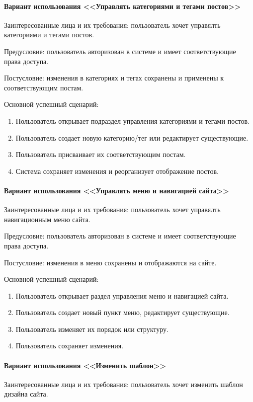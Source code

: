 \paragraph{Вариант использования <<Управлять категориями и тегами постов>>}
Заинтересованные лица и их требования: пользователь хочет управялть категориями и тегами постов.

Предусловие: пользователь авторизован в системе и имеет соответствующие права доступа.

Постусловие: изменения в категориях и тегах сохранены и применены к соответствующим постам.

Основной успешный сценарий:
\begin{enumerate}
	\item Пользователь открывает подраздел управления категориями и тегами постов.
	\item Пользователь создает новую категорию/тег или редактирует существующие.
	\item Пользователь присваивает их соответствующим постам.
	\item Система сохраняет изменения и реорганизует отображение постов.
\end{enumerate}

\paragraph{Вариант использования <<Управлять меню и навигацией сайта>>}
Заинтересованные лица и их требования: пользователь хочет управялть навигационным меню сайта.

Предусловие: пользователь авторизован в системе и имеет соответствующие права доступа.

Постусловие: изменения в меню сохранены и отображаются на сайте.

Основной успешный сценарий:
\begin{enumerate}
	\item Пользователь открывает раздел управления меню и навигацией сайта.
	\item Пользователь создает новый пункт меню, редактирует существующие.
	\item Пользователь изменяет их порядок или структуру.
	\item Пользователь сохраняет изменения.
\end{enumerate}

\paragraph{Вариант использования <<Изменить шаблон>>}
Заинтересованные лица и их требования: пользователь хочет изменить шаблон дизайна сайта.

